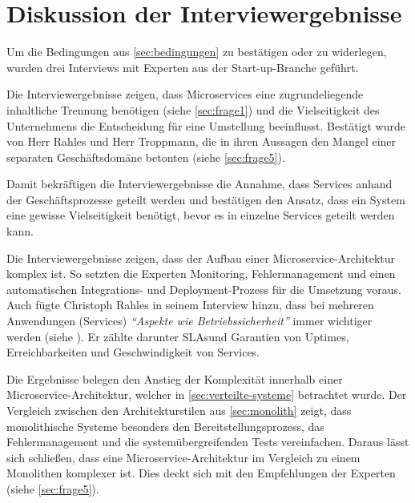\section{Diskussion der Interviewergebnisse}
\label{sec:auswertung}

Um die Bedingungen aus \cref{sec:bedingungen} zu bestätigen oder zu widerlegen, wurden drei Interviews mit Experten aus der Start-up-Branche geführt.

Die Interviewergebnisse zeigen, dass Microservices eine zugrundeliegende inhaltliche Trennung benötigen (siehe \cref{sec:frage1}) und die Vielseitigkeit des Unternehmens die Entscheidung für eine Umstellung beeinflusst. Bestätigt wurde von Herr Rahles und Herr Troppmann, die in ihren Aussagen den Mangel einer separaten Geschäftsdomäne betonten (siehe \cref{sec:frage5}).

\label{sec:vielseitigkeit}
Damit bekräftigen die Interviewergebnisse die Annahme, dass Services anhand der Geschäftsprozesse geteilt werden und bestätigen den Ansatz, dass ein System eine gewisse Vielseitigkeit benötigt, bevor es in einzelne Services geteilt werden kann.

Die Interviewergebnisse zeigen, dass der Aufbau einer Microservice-Architektur komplex ist. So setzten die Experten Monitoring, Fehlermanagement und einen automatischen Integrations- und Deployment-Prozess für die Umsetzung voraus.
Auch fügte Christoph Rahles in seinem Interview hinzu, dass bei mehreren Anwendungen (Services) \textit{\enquote{Aspekte wie Betriebssicherheit}} immer wichtiger werden (siehe ). Er zählte darunter SLAs\footnotemark und Garantien von Uptimes, Erreichbarkeiten und Geschwindigkeit von Services.


Die Ergebnisse belegen den Anstieg der Komplexität innerhalb einer Microservice-Architektur, welcher in \cref{sec:verteilte-systeme} betrachtet wurde. Der Vergleich zwischen den Architekturstilen aus \cref{sec:monolith} zeigt, dass monolithische Systeme besonders den Bereitstellungsprozess, das Fehlermanagement und die systemübergreifenden Tests vereinfachen. Daraus lässt sich schließen, dass eine Microservice-Architektur im Vergleich zu einem Monolithen komplexer ist. Dies deckt sich mit den Empfehlungen der Experten (siehe \cref{sec:frage5}).

